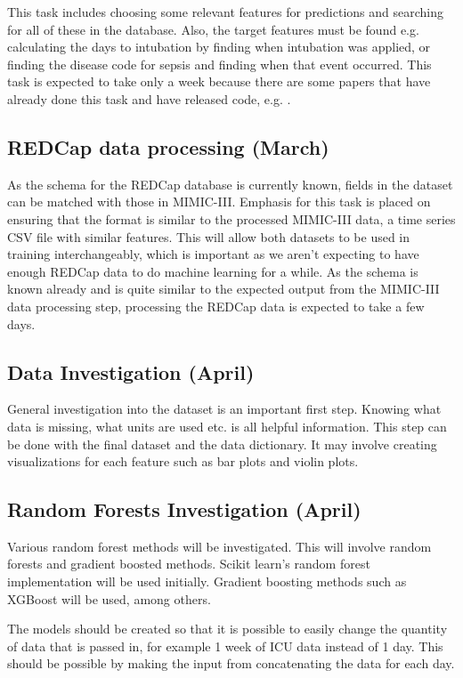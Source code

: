 \documentclass[12pt]{article}
\begin{document}
This task includes choosing some relevant features for predictions and searching for all of these in the database. Also, the target features must be found e.g. calculating the days to intubation by finding when intubation was applied, or finding the disease code for sepsis and finding when that event occurred. This task is expected to take only a week because there are some papers that have already done this task and have released code, e.g. \cite{KajiLSTM}. 

\subsection{REDCap data processing (March) }

As the schema for the REDCap database is currently known, fields in the dataset can be matched with those in MIMIC-III. Emphasis for this task is placed on ensuring that the format is similar to the processed MIMIC-III data, a time series CSV file with similar features. This will allow both datasets to be used in training interchangeably, which is important as we aren't expecting to have enough REDCap data to do machine learning for a while. As the schema is known already and is quite similar to the expected output from the MIMIC-III data processing step, processing the REDCap data is expected to take a few days. 

\subsection{Data Investigation (April)}
General investigation into the dataset is an important first step. Knowing what data is missing, what units are used etc. is all helpful information. This step can be done with the final dataset and the data dictionary. It may involve creating visualizations for each feature such as bar plots and violin plots. 

\subsection{Random Forests Investigation (April)}

Various random forest methods will be investigated.
This will involve random forests and gradient boosted methods. Scikit learn's random forest implementation will be used initially. Gradient boosting methods such as XGBoost will be used, among others.

The models should be created so that it is possible to easily change the quantity of data that is passed in, for example 1 week of ICU data instead of 1 day. This should be possible by making the input from concatenating the data for each day. 
\end{document}
